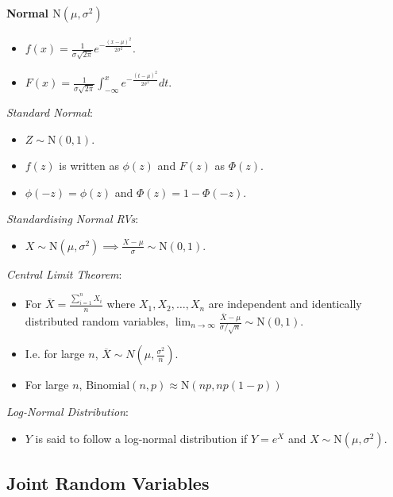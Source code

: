 \documentclass[twocolumn,english]{article}
\begin{document}
\paragraph{Normal $\text{N}\left(\mu,\sigma^{2}\right)$}
\begin{itemize}
\item $f\left(x\right)=\frac{1}{\sigma\sqrt{2\pi}}e^{-\frac{\left(x-\mu\right)^{2}}{2\sigma^{2}}}$.
\item $F\left(x\right)=\frac{1}{\sigma\sqrt{2\pi}}\int_{-\infty}^{x}e^{-\frac{\left(t-\mu\right)^{2}}{2\sigma^{2}}}dt$.
\end{itemize}
\emph{Standard Normal}:
\begin{itemize}
\item $Z\sim\text{N}\left(0,1\right)$.
\item $f\left(z\right)$ is written as $\phi\left(z\right)$ and $F\left(z\right)$
as $\Phi\left(z\right)$.
\item $\phi\left(-z\right)=\phi\left(z\right)$ and $\Phi\left(z\right)=1-\Phi\left(-z\right)$.
\end{itemize}
\emph{Standardising Normal RVs}:
\begin{itemize}
\item $X\sim\text{N}\left(\mu,\sigma^{2}\right)\implies\frac{X-\mu}{\sigma}\sim\text{N}\left(0,1\right)$.
\end{itemize}
\emph{Central Limit Theorem}:
\begin{itemize}
\item For $\overline{X}=\frac{\sum_{i=1}^{n}X_{i}}{n}$ where $X_{1},X_{2},\dots,X_{n}$
are independent and identically distributed random variables, $\lim_{n\rightarrow\infty}\frac{\overline{X}-\mu}{\sigma/\sqrt{n}}\sim\text{N}\left(0,1\right)$.
\item I.e. for large $n$, $\overline{X}\sim N\left(\mu,\frac{\sigma^{2}}{n}\right)$.
\item For large $n$, $\text{Binomial}\left(n,p\right)\approx\text{N}\left(np,np\left(1-p\right)\right)$
\end{itemize}
\emph{Log-Normal Distribution}:
\begin{itemize}
\item $Y$ is said to follow a log-normal distribution if $Y=e^{X}$ and
$X\sim\text{N}\left(\mu,\sigma^{2}\right)$.
\end{itemize}

\subsection{Joint Random Variables}
\end{document}
